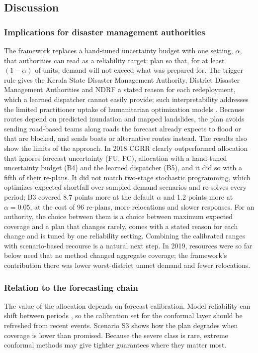 \documentclass[pdflatex,sn-basic]{sn-jnl}
\theoremstyle{plain}%
\theoremstyle{remark}%
\theoremstyle{definition}%
\begin{document}
\subsection{Discussion}

\subsubsection{Implications for disaster management authorities}
 The framework replaces a hand-tuned uncertainty budget with one setting, $\alpha$, that authorities can read as a reliability target: plan so that, for at least $(1-\alpha)$ of units, demand will not exceed what was prepared for. The trigger rule gives the Kerala State Disaster Management Authority, District Disaster Management Authorities and NDRF a stated reason for each redeployment, which a learned dispatcher cannot easily provide; such interpretability addresses the limited practitioner uptake of humanitarian optimization models \citep{RodriguezEspindola2023}. Because routes depend on predicted inundation and mapped landslides, the plan avoids sending road-based teams along roads the forecast already expects to flood or that are blocked, and sends boats or alternative routes instead. The results also show the limits of the approach. In 2018 CGRR clearly outperformed allocation that ignores forecast uncertainty (FU, FC), allocation with a hand-tuned uncertainty budget (B4) and the learned dispatcher (B5), and it did so with a fifth of their re-plans. It did not match two-stage stochastic programming, which optimizes expected shortfall over sampled demand scenarios and re-solves every period; B3 covered 8.7 points more at the default $\alpha$ and 1.2 points more at $\alpha = 0.05$, at the cost of 96 re-plans, more relocations and slower responses. For an authority, the choice between them is a choice between maximum expected coverage and a plan that changes rarely, comes with a stated reason for each change and is tuned by one reliability setting. Combining the calibrated ranges with scenario-based recourse is a natural next step. In 2019, resources were so far below need that no method changed aggregate coverage; the framework's contribution there was lower worst-district unmet demand and fewer relocations.

\subsubsection{Relation to the forecasting chain}
 The value of the allocation depends on forecast calibration. Model reliability can shift between periods \citep{Xiao2026}, so the calibration set for the conformal layer should be refreshed from recent events. Scenario S3 shows how the plan degrades when coverage is lower than promised. Because the severe class is rare, extreme conformal methods \citep{Pasche2026} may give tighter guarantees where they matter most.
\end{document}
